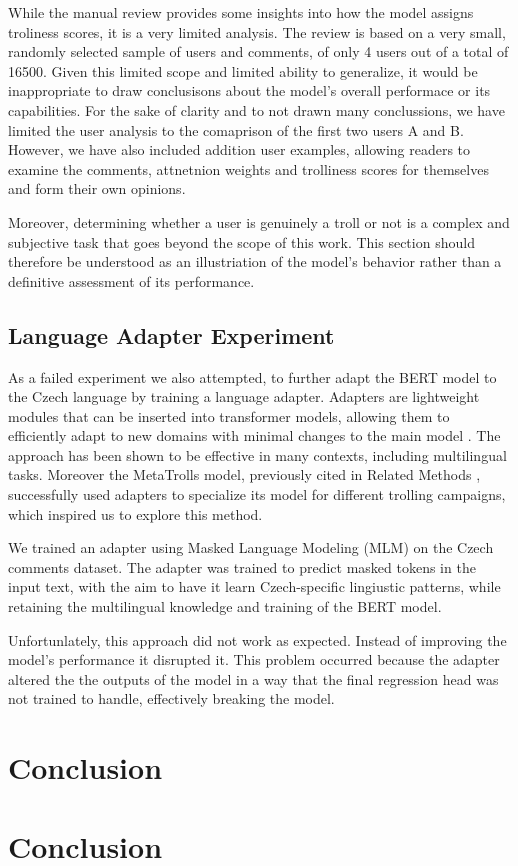 \documentclass[twoside]{ctuthesis}
\theoremstyle{plain}
\theoremstyle{definition}
\theoremstyle{note}
\begin{document}
While the manual review provides some insights into how the model assigns troliness scores, it is a very limited analysis. The review is based on a very small, randomly selected sample of users and comments, of only 4 users out of a total of 16500. Given this limited scope and limited ability to generalize, it would be inappropriate to draw conclusisons about the model's overall performace or its capabilities. For the sake of clarity and to not drawn many conclussions, we have limited the user analysis to the comaprison of the first two users A and B. However, we have also included addition user examples, allowing readers to examine the comments, attnetnion weights and trolliness scores for themselves and form their own opinions. \par
Moreover, determining whether a user is genuinely a troll or not is a complex and subjective task that goes beyond the scope of this work. This section should therefore be understood as an illustriation of the model's behavior rather than a definitive assessment of its performance.\par

\section{Language Adapter Experiment}
As a failed experiment we also attempted, to further adapt the BERT model to the Czech language by training a language adapter. Adapters are lightweight modules that can be inserted into transformer models, allowing them to efficiently adapt to new domains with minimal changes to the main model \cite{Houlsby2019}. The approach has been shown to be effective in many contexts, including multilingual tasks. Moreover the MetaTrolls model, previously cited in Related Methods \cite{Tian2023}, successfully used adapters to specialize its model for different trolling campaigns, which inspired us to explore this method.\par

We trained an adapter using Masked Language Modeling (MLM) on the Czech comments dataset. The adapter was trained to predict masked tokens in the input text, with the aim to have it learn Czech-specific lingiustic patterns, while retaining the multilingual knowledge and training of the BERT model.\par

Unfortunlately, this approach did not work as expected. Instead of improving the model's performance it disrupted it. This problem occurred because the adapter altered the the outputs of the model in a way that the final regression head was not trained to handle, effectively breaking the model. \par
 
\chapter{Conclusion}




\chapter{Conclusion}

\appendix

\printindex

 

\end{document}
